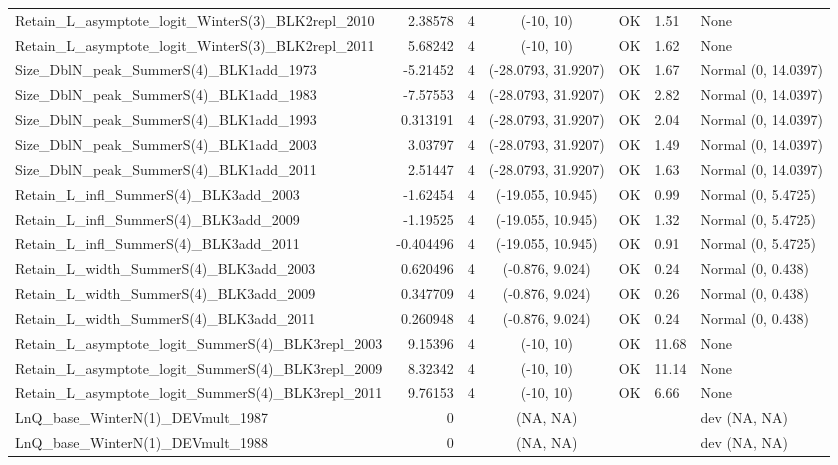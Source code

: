 \documentclass[12pt,]{article}
\begin{document}
\begin{landscape}
\begin{longtable}{lrcccll}
  Retain\_L\_asymptote\_logit\_WinterS(3)\_BLK2repl\_2010 & 2.38578 & 4 & (-10, 10) & OK & 1.51 & None \\ 
  Retain\_L\_asymptote\_logit\_WinterS(3)\_BLK2repl\_2011 & 5.68242 & 4 & (-10, 10) & OK & 1.62 & None \\ 
  Size\_DblN\_peak\_SummerS(4)\_BLK1add\_1973 & -5.21452 & 4 & (-28.0793, 31.9207) & OK & 1.67 & Normal (0, 14.0397) \\ 
  Size\_DblN\_peak\_SummerS(4)\_BLK1add\_1983 & -7.57553 & 4 & (-28.0793, 31.9207) & OK & 2.82 & Normal (0, 14.0397) \\ 
  Size\_DblN\_peak\_SummerS(4)\_BLK1add\_1993 & 0.313191 & 4 & (-28.0793, 31.9207) & OK & 2.04 & Normal (0, 14.0397) \\ 
  Size\_DblN\_peak\_SummerS(4)\_BLK1add\_2003 & 3.03797 & 4 & (-28.0793, 31.9207) & OK & 1.49 & Normal (0, 14.0397) \\ 
  Size\_DblN\_peak\_SummerS(4)\_BLK1add\_2011 & 2.51447 & 4 & (-28.0793, 31.9207) & OK & 1.63 & Normal (0, 14.0397) \\ 
  Retain\_L\_infl\_SummerS(4)\_BLK3add\_2003 & -1.62454 & 4 & (-19.055, 10.945) & OK & 0.99 & Normal (0, 5.4725) \\ 
  Retain\_L\_infl\_SummerS(4)\_BLK3add\_2009 & -1.19525 & 4 & (-19.055, 10.945) & OK & 1.32 & Normal (0, 5.4725) \\ 
  Retain\_L\_infl\_SummerS(4)\_BLK3add\_2011 & -0.404496 & 4 & (-19.055, 10.945) & OK & 0.91 & Normal (0, 5.4725) \\ 
  Retain\_L\_width\_SummerS(4)\_BLK3add\_2003 & 0.620496 & 4 & (-0.876, 9.024) & OK & 0.24 & Normal (0, 0.438) \\ 
  Retain\_L\_width\_SummerS(4)\_BLK3add\_2009 & 0.347709 & 4 & (-0.876, 9.024) & OK & 0.26 & Normal (0, 0.438) \\ 
  Retain\_L\_width\_SummerS(4)\_BLK3add\_2011 & 0.260948 & 4 & (-0.876, 9.024) & OK & 0.24 & Normal (0, 0.438) \\ 
  Retain\_L\_asymptote\_logit\_SummerS(4)\_BLK3repl\_2003 & 9.15396 & 4 & (-10, 10) & OK & 11.68 & None \\ 
  Retain\_L\_asymptote\_logit\_SummerS(4)\_BLK3repl\_2009 & 8.32342 & 4 & (-10, 10) & OK & 11.14 & None \\ 
  Retain\_L\_asymptote\_logit\_SummerS(4)\_BLK3repl\_2011 & 9.76153 & 4 & (-10, 10) & OK & 6.66 & None \\ 
  LnQ\_base\_WinterN(1)\_DEVmult\_1987 & 0 &  & (NA, NA) &  &  & dev (NA, NA) \\ 
  LnQ\_base\_WinterN(1)\_DEVmult\_1988 & 0 &  & (NA, NA) &  &  & dev (NA, NA) \\ 

\end{longtable}
\end{landscape}
\end{document}
